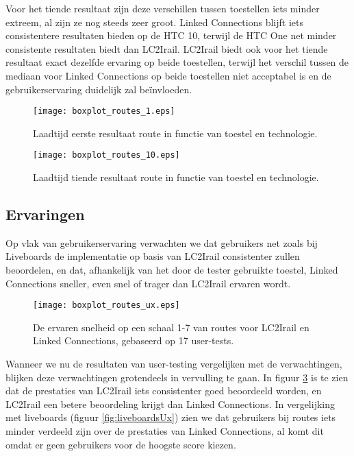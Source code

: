 Voor het tiende resultaat zijn deze verschillen tussen toestellen iets minder extreem, al zijn ze nog steeds zeer groot. Linked Connections blijft iets consistentere resultaten bieden op de HTC 10, terwijl de HTC One net minder consistente resultaten biedt dan LC2Irail. LC2Irail biedt ook voor het tiende resultaat exact dezelfde ervaring op beide toestellen, terwijl het verschil tussen de mediaan voor Linked Connections op beide toestellen niet acceptabel is en de gebruikerservaring duidelijk zal beïnvloeden.

\begin{figure}[h]
	\centering
	\texttt{[image: boxplot\_routes\_1.eps]}
	\caption[Laadtijd eerste resultaat route in functie van toestel en technologie]{Laadtijd eerste resultaat route in functie van toestel en technologie.}
	\label{fig:routesBoxplot1}
\end{figure}

\begin{figure}[h]
	\centering
	\texttt{[image: boxplot\_routes\_10.eps]}
	\caption[Laadtijd tiende resultaat route in functie van toestel en technologie]{Laadtijd tiende resultaat route in functie van toestel en technologie.}
	\label{fig:routesBoxplot10}
\end{figure}

\subsection{Ervaringen}

Op vlak van gebruikerservaring verwachten we dat gebruikers net zoals bij Liveboards de implementatie op basis van LC2Irail consistenter zullen beoordelen, en dat, afhankelijk van het door de tester gebruikte toestel, Linked Connections sneller, even snel of trager dan LC2Irail ervaren wordt.

\begin{figure}[h]
	\centering
	\texttt{[image: boxplot\_routes\_ux.eps]}
	\caption[Ervaren snelheid van routes]{De ervaren snelheid op een schaal 1-7 van routes voor LC2Irail en Linked Connections, gebaseerd op 17 user-tests.}
	\label{fig:routesUx}
\end{figure}

Wanneer we nu de resultaten van user-testing vergelijken met de verwachtingen, blijken deze verwachtingen grotendeels in vervulling te gaan. In figuur \ref{fig:routesUx} is te zien dat de prestaties van LC2Irail iets consistenter goed beoordeeld worden, en LC2Irail een betere beoordeling krijgt dan Linked Connections. In vergelijking met liveboards (figuur \ref{fig:liveboardsUx}) zien we dat gebruikers bij routes iets minder verdeeld zijn over de prestaties van Linked Connections, al komt dit omdat er geen gebruikers voor de hoogste score kiezen. 

